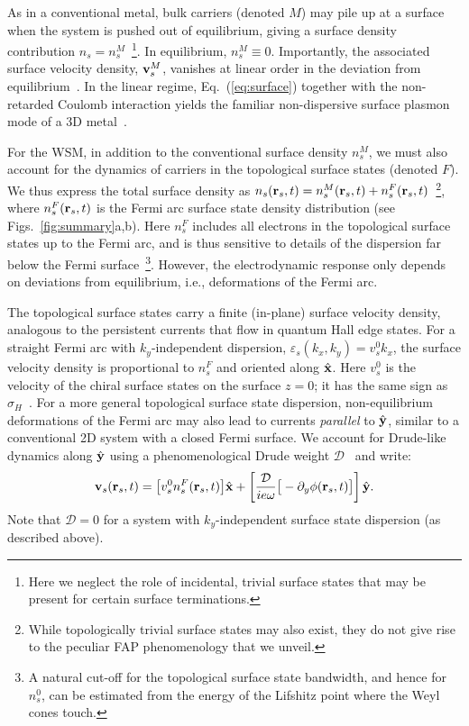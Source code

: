 \documentclass[aps,twocolumn,prl,groupedaddress]{revtex4}
\newcommand{\be}{\begin{equation}}
\newcommand{\ee}{\end{equation}}
\renewcommand{\vec}[1]{{\bf #1}}
\renewcommand{\epsilon}{\varepsilon}
\begin{document}
As in a conventional metal, 
bulk carriers (denoted $M$) may pile up at a 
surface when the system is pushed out of equilibrium, giving a surface density contribution $n_s = n_s^{M}$~\footnote{Here we neglect the role of incidental, trivial surface states that may be present for certain surface terminations.}.
In equilibrium, $n_s^M \equiv 0$.
Importantly, 
the associated surface velocity density, $\vec v^M_s$, 
vanishes at linear order in the deviation from equilibrium~\cite{SI}. 
In the linear regime, Eq.~(\ref{eq:surface}) together with 
the non-retarded Coulomb interaction  yields the familiar non-dispersive surface plasmon mode of a 3D metal~\cite{ritchie}.

For the WSM, in addition to the conventional surface density $n_s^M$, we must also account for the dynamics of carriers in the topological surface states (denoted $F$). 
We thus express the total surface density as $n_s(\vec{r}_s, t) = n_s^M(\vec{r}_s, t) + n_s^F(\vec{r}_s, t)$~\footnote{While topologically trivial surface states may also exist, they do not give rise to the peculiar FAP phenomenology that we unveil.}, where
$n_s^F(\vec{r}_s, t)$ is the Fermi arc surface state density distribution (see Figs.~\ref{fig:summary}a,b).
Here $n_s^F$ includes all electrons in the topological surface states up to the Fermi arc, and is thus sensitive to details of the dispersion far below the Fermi surface~\footnote{A natural cut-off for the topological surface state bandwidth, and hence for $n_s^{0}$, can be estimated from the energy of the Lifshitz point where the Weyl cones touch.}. However, the electrodynamic response only depends on deviations from equilibrium, i.e., deformations of the Fermi arc.

The topological surface states carry a finite (in-plane) surface velocity density, analogous to the persistent currents that flow in quantum Hall edge states. For a straight Fermi arc with $k_y$-independent dispersion, $\epsilon_{s}(k_x, k_y) = v_s^0 k_x$, the surface velocity density is proportional to $n_s^F$ and oriented along $\hat{\vec{x}}$. Here $v_s^0$ is the velocity of the chiral surface states on the surface $z = 0$; it has the same sign as $\sigma_H$~\cite{SI}. For a more general topological surface state dispersion, non-equilibrium deformations of the Fermi arc may also lead to currents {\it parallel} to $\hat{\vec{y}}$, 
similar to a conventional 2D system with a closed Fermi surface.
We account for 
Drude-like 
dynamics along $\hat{\vec{y}}$ using a phenomenological Drude weight $\mathcal{D}$~\cite{SI} 
and write: 
\be
\vec v_s (\vec r_s, t)= \big[v_s^0 n_s^F (\vec r_s, t)\big] \hat{\vec{x} } + \left[\frac{\mathcal{D}}{i e \omega} \big[-\partial_y \phi(\vec r_s, t)\big]\right] \hat{{\vec y}}. 
\label{eq:vel}
\ee
Note that $\mathcal{D} = 0$ for a system with $k_y$-independent surface state dispersion (as described above).
\end{document}

